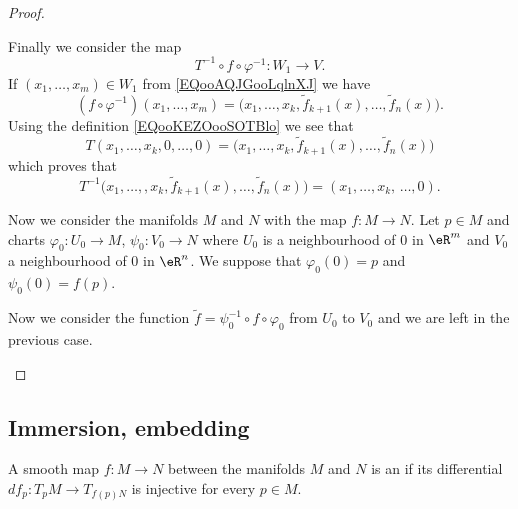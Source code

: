 \begin{proof}
\begin{subproof}
\begin{subproof}

			Finally we consider the map
			\begin{equation}
				T^{-1}\circ f\circ \varphi^{-1}\colon W_1 \to V.
			\end{equation}
			If \( (x_1,\ldots, x_m)\in W_1\) from \eqref{EQooAQJGooLqlnXJ} we have
			\begin{equation}
				(f\circ \varphi^{-1})(x_1,\ldots, x_m)=\big( x_1,\ldots, x_k,\tilde f_{k+1}(x),\ldots, \tilde f_n(x) \big).
			\end{equation}
			Using the definition \eqref{EQooKEZOooSOTBlo} we see that
			\begin{equation}
				T(x_1,\ldots, x_k,0,\ldots, 0)=\big( x_1,\ldots, x_k,\tilde f_{k+1}(x),\ldots, \tilde f_n(x) \big)
			\end{equation}
			which proves that
			\begin{equation}
				T^{-1}\big( x_1,\ldots, ,x_k,\tilde f_{k+1}(x),\ldots, \tilde f_n(x) \big)=(x_1,\ldots, x_k,\,\ldots, 0).
			\end{equation}
		\end{subproof}


		Now we consider the manifolds \( M\) and \( N\) with the map \( f\colon M\to N\). Let \( p\in M\) and charts \( \varphi_0\colon U_0\to M\), \( \psi_0\colon V_0\to N\) where \( U_0\) is a neighbourhood of \( 0\) in \( \eR^m\) and \( V_0\) a neighbourhood of \( 0\) in \( \eR^n\). We suppose that \( \varphi_0(0)=p\) and \( \psi_0(0)=f(p)\).

		Now we consider the function \( \tilde f=\psi_0^{-1}\circ f\circ \varphi_0\) from \( U_0\) to \( V_0\) and we are left in the previous case.
	\end{subproof}
\end{proof}

\subsection{Immersion, embedding}

\begin{definition}    \label{DEFooZEWNooMVOzWI}
	A smooth map \( f\colon M\to N\) between the manifolds \( M\) and \( N\) is an  if its differential \( df_p\colon T_pM\to T_{f(p)N}\) is injective for every \( p\in M\).
\end{definition}

